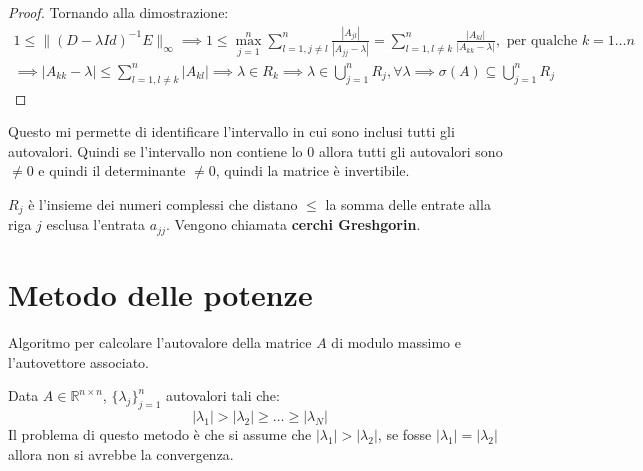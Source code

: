 \begin{teorema} 
\begin{proof}
        Tornando alla dimostrazione:
        \begin{equation*}
            \begin{aligned}
                1 \leq \|(D - \lambda Id)^{-1}E\|_\infty \implies 1 \leq \max_{j = 1}^n
                \sum_{l = 1,j \neq l}^{n} \frac{|A_{jl}|}{|A_{jj} - \lambda|} =
                \sum_{l = 1,l \neq k}^{n} \frac{|A_{kl}|}{|A_{kk} - \lambda|},
                \text{ per qualche }k = 1 \dots n \\ \implies |A_{kk} - \lambda| \leq
                \sum_{l = 1,l \neq k}^{n} |A_{kl}| \implies \lambda \in R_k \implies
                \lambda \in \bigcup_{j = 1}^n R_j, \forall \lambda \implies
                \sigma(A) \subseteq \bigcup_{j = 1}^n R_j
            \end{aligned}
        \end{equation*}
    \end{proof}
\end{teorema}
Questo mi permette di identificare l'intervallo in cui sono inclusi tutti gli
autovalori. Quindi se l'intervallo non contiene lo $0$ allora tutti gli autovalori
sono $\neq 0$ e quindi il determinante $\ne 0$, quindi la matrice è invertibile.
\begin{nota}
    $R_j$ è l'insieme dei numeri complessi che distano $\le$ la somma delle entrate
    alla riga $j$ esclusa l'entrata $a_{jj}$. Vengono chiamata \textbf{cerchi Greshgorin}.
\end{nota}
\section{Metodo delle potenze}
Algoritmo per calcolare l'autovalore della matrice $A$ di modulo massimo e
l'autovettore associato.

Data $A\in \mathbb{R}^{n\times n}$, $\{\lambda_j\}^n_{j = 1}$ autovalori tali che:
\begin{equation*}
    |\lambda_1|> |\lambda_2| \geq \dots \geq |\lambda_N|
\end{equation*}
Il problema di questo metodo è che si assume che $|\lambda_1|> |\lambda_2|$,
se fosse $|\lambda_1| = |\lambda_2|$ allora non si avrebbe la convergenza.

